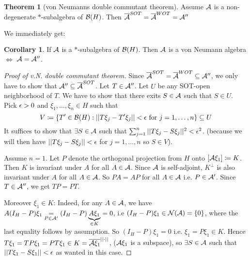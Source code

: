 \documentclass[10pt,english,a4paper]{article}
\theoremstyle{definition}
\newtheorem*{theorem}{Theorem}
\newtheorem*{corollary}{Corollary}
\begin{document}
\begin{theorem}[von Neumanns double commutant theorem]
    Assume $\mathcal{A}$ is a non-degenerate $*$-subalgebra of $\mathcal{B}(H)$. 
Then $\overline{\mathcal{A}}^{SOT} = \overline{\mathcal{A}}^{WOT} = \mathcal{A}''$ 
\end{theorem}
We immediately get:
\begin{corollary}
    If $\mathcal{A}$ is a $*$-subalgebra of $\mathcal{B}(H)$. Then $\mathcal{A}$ is a von
Neumann algebra $\iff$ $\mathcal{A} = \mathcal{A}''$.
\end{corollary}
\begin{proof}[Proof of v.N. double commutant theorem]
    Since $\overline{\mathcal{A}}^{SOT} = \overline{\mathcal{A}}^{WOT} \subseteq \mathcal{A}''$, we 
only have to show that $\mathcal{A}'' \subseteq \overline{\mathcal{A}}^{SOT}$.
Let $T \in \mathcal{A}''$. Let $U$ be any SOT-open neighborhood of $T$. We have 
to show that there exits $S \in \mathcal{A}$ such that $S \in U$. Pick 
$\epsilon > 0$ and $\xi_1,\ldots, \xi_n \in H$ such that 
\[ V\coloneqq \{ T' \in \mathcal{B}(H) : ||T\xi_j - T'\xi_j|| < \epsilon \text{ for }j
=1,\ldots,n \} \subseteq U\]
It suffices to show that $\exists S \in \mathcal{A}$ such that 
$\sum_{j=1}^{n} ||T\xi_j - S\xi_j||^2 < \epsilon^2$.
(because we will then have $||T\xi_j - S\xi_j || < \epsilon$ for $j=1,\ldots, n$
so $S \in V$).

Assume $n=1$. Let $P$ denote the orthogonal projection from $H$ onto
$[\mathcal{A}\xi_1] \coloneqq K$. Then $K$ is invariant under $A$ for all $A \in \mathcal{A}$.
Since $\mathcal{A}$ is self-adjoint, $K^{\perp}$ is also invariant under $A$ for all $A
\in \mathcal{A}$. So $PA = AP$ for all $A \in \mathcal{A}$ i.e. $P\in \mathcal{A}'$.
Since $T \in \mathcal{A}''$, we get $TP=PT$. 

Moreover $\xi_1 \in K$:
Indeed, for any $A \in \mathcal{A}$, we have $A(I_H - P)\xi_1 \underset{P\in \mathcal{A}'}{=}
(I_H-P)\underbrace{A\xi_1}_{\in
K} = 0$, i.e $(I_H -P)\xi_1 \in \mathcal{N}(\mathcal{A}) = \{0\}$, where the last equality
follows by assumption. So $(I_H - P)\xi_1 = 0$ i.e. $\xi_1 = P\xi_1 \in K$.
Hence $T\xi_1 = TP\xi_1 = PT\xi_1 \in K = \overline{\mathcal{A}\xi_1}^{||\cdot||}$,
($\mathcal{A}\xi_1$ is a subspace), 
so $\exists S \in \mathcal{A} $ such that $||T\xi_1 - S\xi_1|| < \epsilon$ as wanted in this case.


\end{proof}
\end{document}

